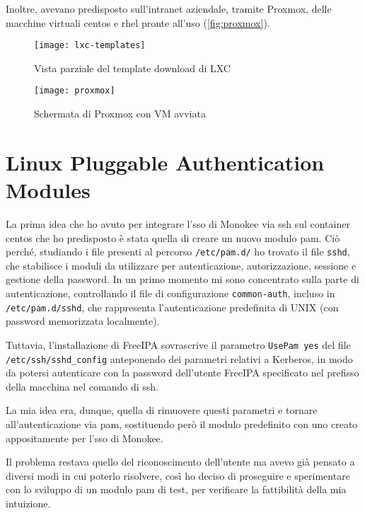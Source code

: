 Inoltre, avevano predisposto sull'intranet aziendale, tramite Proxmox, delle macchine virtuali \acrshort{centos} e \acrshort{rhel} pronte all'uso (\autoref{fig:proxmox}).

\begin{figure}[H] 
    \centering 
    \texttt{[image: lxc-templates]} 
    \caption{Vista parziale del template download di LXC}
    \label{fig:lxc-template}
\end{figure}

\begin{figure}[H] 
    \centering 
    \texttt{[image: proxmox]} 
    \caption{Schermata di Proxmox con VM avviata}
    \label{fig:proxmox}
\end{figure}
\section{Linux Pluggable Authentication Modules}
\label{sec:tecnologie-strumenti}

La prima idea che ho avuto per integrare l'\acrshort{sso} di Monokee via \acrshort{ssh} sul container \acrshort{centos} che ho predisposto è stata quella di creare un nuovo modulo \acrshort{pam}. Ciò perché, studiando i file presenti al percorso \texttt{/etc/pam.d/} ho trovato il file \texttt{sshd}, che stabilisce i moduli da utilizzare per autenticazione, autorizzazione, sessione e gestione della password. In un primo momento mi sono concentrato sulla parte di autenticazione, controllando il file di configurazione \texttt{common-auth}, incluso in \texttt{/etc/pam.d/sshd}, che rappresenta l'autenticazione predefinita di UNIX (con password memorizzata localmente). 

Tuttavia, l'installazione di FreeIPA sovrascrive il parametro \texttt{UsePam yes} del file \texttt{/etc/ssh/sshd\_config} anteponendo dei parametri relativi a Kerberos, in modo da potersi autenticare con la password dell'utente FreeIPA specificato nel prefisso della macchina nel comando di \acrshort{ssh}.

La mia idea era, dunque, quella di rimuovere questi parametri e tornare all'autenticazione via \acrshort{pam}, sostituendo però il modulo predefinito con uno creato appositamente per l'\acrshort{sso} di Monokee.

Il problema restava quello del riconoscimento dell'utente ma avevo già pensato a diversi modi in cui poterlo risolvere, così ho deciso di proseguire e sperimentare con lo sviluppo di un modulo \acrshort{pam} di test, per verificare la fattibilità della mia intuizione.

